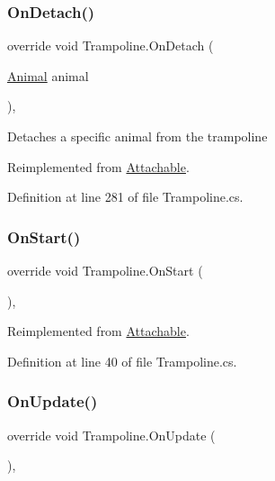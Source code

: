 \subsubsection{\texorpdfstring{On\+Detach()}{OnDetach()}}
{\footnotesize\ttfamily override void Trampoline.\+On\+Detach (\begin{DoxyParamCaption}\item[{\mbox{\hyperlink{class_animal}{Animal}}}]{animal }\end{DoxyParamCaption})\hspace{0.3cm}{\ttfamily [protected]}, {\ttfamily [virtual]}}



Detaches a specific animal from the trampoline 



Reimplemented from \mbox{\hyperlink{class_attachable_abe7cf9d7930393610c7c9c4ae14b12d7}{Attachable}}.



Definition at line 281 of file Trampoline.\+cs.

\mbox{\label{class_trampoline_a8ca649f9cd7a2ec2510ab39888c3dd16}} 
\subsubsection{\texorpdfstring{On\+Start()}{OnStart()}}
{\footnotesize\ttfamily override void Trampoline.\+On\+Start (\begin{DoxyParamCaption}{ }\end{DoxyParamCaption})\hspace{0.3cm}{\ttfamily [protected]}, {\ttfamily [virtual]}}



Reimplemented from \mbox{\hyperlink{class_attachable_a3c05c0b07b831881a7ab245057d34d30}{Attachable}}.



Definition at line 40 of file Trampoline.\+cs.

\mbox{\label{class_trampoline_acb12701ada778aa924cf51b892abc364}} 
\subsubsection{\texorpdfstring{On\+Update()}{OnUpdate()}}
{\footnotesize\ttfamily override void Trampoline.\+On\+Update (\begin{DoxyParamCaption}{ }\end{DoxyParamCaption})\hspace{0.3cm}{\ttfamily [protected]}, {\ttfamily [virtual]}}



